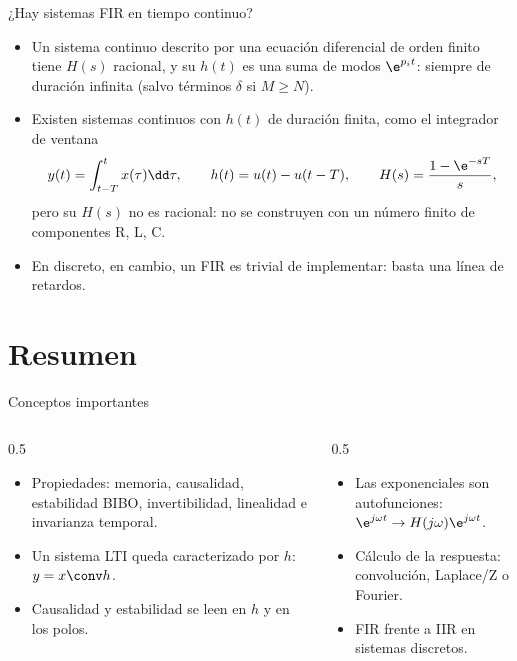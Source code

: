 \documentclass[aspectratio=169,11pt]{beamer}
\begin{document}
\begin{frame}{¿Hay sistemas FIR en tiempo continuo?}
  \begin{itemize}
    \item Un sistema continuo descrito por una ecuación diferencial de orden finito tiene $H(s)$ racional, y su $h(t)$ es una suma de modos $\e^{p_it}$: \alert{siempre de duración infinita} (salvo términos $\delta$ si $M\ge N$).
    \item Existen sistemas continuos con $h(t)$ de duración finita, como el integrador de ventana
      \[
        y(t)=\int_{t-T}^{t}x(\tau)\dd\tau,\qquad h(t)=u(t)-u(t-T),\qquad H(s)=\frac{1-\e^{-sT}}{s},
      \]
      pero su $H(s)$ \alert{no es racional}: no se construyen con un número finito de componentes R, L, C.
    \item En discreto, en cambio, un FIR es trivial de implementar: basta una línea de retardos.
  \end{itemize}
\end{frame}

\section*{Resumen}
\begin{frame}{Conceptos importantes}
  \begin{columns}[T]
    \begin{column}{0.5\textwidth}
      \begin{itemize}
        \item Propiedades: memoria, causalidad, estabilidad BIBO, invertibilidad, \alert{linealidad} e \alert{invarianza temporal}.
        \item Un sistema LTI queda caracterizado por $h$: $y=x\conv h$.
        \item Causalidad y estabilidad se leen en $h$ y en los polos.
      \end{itemize}
    \end{column}
    \begin{column}{0.5\textwidth}
      \begin{itemize}
        \item Las exponenciales son autofunciones: $\e^{j\omega t}\to H(j\omega)\e^{j\omega t}$.
        \item Cálculo de la respuesta: convolución, Laplace/Z o Fourier.
        \item FIR frente a IIR en sistemas discretos.
      \end{itemize}
    \end{column}
  \end{columns}
  \bigskip
\end{frame}
\end{document}
